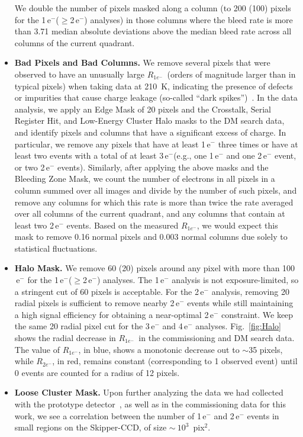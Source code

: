 \documentclass[aps,prl,twocolumn,showpacs,superscriptaddress,preprintnumbers]{revtex4-1}
\newcommand{\unit}[1]{\ensuremath{\mathrm{\,#1}}\xspace}
\newcommand{\e}{\unit{e^{-}}}
\newcommand{\Rs}{$R_{1e^-}$}
\newcommand{\Rtwo}{$R_{2e^-}$}
\begin{document}
\begin{itemize}[leftmargin=*]
We double the number of pixels masked along a column (to 200 (100) pixels for the 1\e ($\ge$2\e) analyses) in those columns where the bleed rate is more than 3.71 median absolute deviations above the median bleed rate across all columns of the current quadrant. 
%
\item {\bf Bad Pixels and Bad Columns.} 
We remove several pixels that were observed to have an unusually large \Rs\ (orders of magnitude larger than in typical pixels) when taking data at 210~K, indicating the presence of defects or impurities that cause charge leakage (so-called ``dark spikes'')~\cite{janesick2001scientific}. 
In the data analysis, we apply an Edge Mask of 20 pixels and the Crosstalk, Serial Register Hit, and Low-Energy Cluster Halo masks to the DM search data, and identify pixels and columns that have a significant excess of charge.
In particular, we remove any pixels that have at least 1\e three times or have at least two events with a total of at least 3\e (e.g., one 1\e and one 2\e event, or two 2\e events). 
Similarly, after applying the above masks and the Bleeding Zone Mask, we count the number of electrons in all pixels in a column summed over all images and divide by the number of such pixels, and remove any columns for which this rate is more than twice the rate averaged over all columns of the current quadrant, and any columns that contain at least two 2\e events.
Based on the measured \Rs, we would expect this mask to remove 0.16 normal pixels and 0.003 normal columns due solely to statistical fluctuations.
%
\item {\bf Halo Mask.}  We remove 60 (20) pixels around any pixel with more than 100\e for the 1\e ($\ge$2\e) analyses.  The 1\e analysis is not exposure-limited, so a stringent cut of 60 pixels is acceptable.  For the 2\e analysis, removing 20 radial pixels is sufficient to remove nearby 2\e events while still maintaining a high signal efficiency for obtaining a near-optimal 2\e constraint.  We keep the same 20 radial pixel cut for the 3\e and 4\e analyses.  
Fig.~\ref{fig:Halo} shows the radial decrease in \Rs\ in the commissioning and DM search data.  
The value of \Rs, in blue, shows a monotonic decrease out to $\sim$35 pixels, while \Rtwo, in red, remains constant (corresponding to 1 observed event) until 0 events are counted for a radius of 12 pixels. 
%
\item {\bf Loose Cluster Mask.} 
Upon further analyzing the data we had collected with the prototype detector~\cite{Abramoff:2019dfb}, as well as in the commissioning data for this work,  we see a correlation between the number of 1\e and 2\e events in small regions on the Skipper-CCD, of size $\sim\ 10^3$~pix$^2$.  

\end{itemize}
\end{document}
